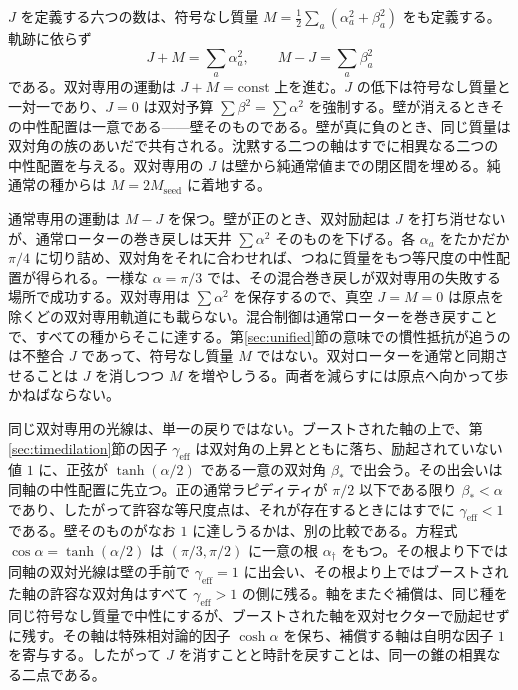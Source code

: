 \documentclass[a4paper]{article}
\begin{document}
$J$ を定義する六つの数は、符号なし質量 $M=\tfrac12\sum_a(\alpha_a^2+\beta_a^2)$ をも定義する。軌跡に依らず
\[
J+M=\sum_a\alpha_a^2,\qquad M-J=\sum_a\beta_a^2
\]
である。双対専用の運動は $J+M=\mathrm{const}$ 上を進む。$J$ の低下は符号なし質量と一対一であり、$J=0$ は双対予算 $\sum\beta^2=\sum\alpha^2$ を強制する。壁が消えるときその中性配置は一意である——壁そのものである。壁が真に負のとき、同じ質量は双対角の族のあいだで共有される。沈黙する二つの軸はすでに相異なる二つの中性配置を与える。双対専用の $J$ は壁から純通常値までの閉区間を埋める。純通常の種からは $M=2M_{\mathrm{seed}}$ に着地する。

通常専用の運動は $M-J$ を保つ。壁が正のとき、双対励起は $J$ を打ち消せないが、通常ローターの巻き戻しは天井 $\sum\alpha^2$ そのものを下げる。各 $\alpha_a$ をたかだか $\pi/4$ に切り詰め、双対角をそれに合わせれば、つねに質量をもつ等尺度の中性配置が得られる。一様な $\alpha=\pi/3$ では、その混合巻き戻しが双対専用の失敗する場所で成功する。双対専用は $\sum\alpha^2$ を保存するので、真空 $J=M=0$ は原点を除くどの双対専用軌道にも載らない。混合制御は通常ローターを巻き戻すことで、すべての種からそこに達する。第\ref{sec:unified}節の意味での慣性抵抗が追うのは不整合 $J$ であって、符号なし質量 $M$ ではない。双対ローターを通常と同期させることは $J$ を消しつつ $M$ を増やしうる。両者を減らすには原点へ向かって歩かねばならない。

同じ双対専用の光線は、単一の戻りではない。ブーストされた軸の上で、第\ref{sec:timedilation}節の因子 $\gamma_{\mathrm{eff}}$ は双対角の上昇とともに落ち、励起されていない値 $1$ に、正弦が $\tanh(\alpha/2)$ である一意の双対角 $\beta_\ast$ で出会う。その出会いは同軸の中性配置に先立つ。正の通常ラピディティが $\pi/2$ 以下である限り $\beta_\ast<\alpha$ であり、したがって許容な等尺度点は、それが存在するときにはすでに $\gamma_{\mathrm{eff}}<1$ である。壁そのものがなお $1$ に達しうるかは、別の比較である。方程式 $\cos\alpha=\tanh(\alpha/2)$ は $(\pi/3,\pi/2)$ に一意の根 $\alpha_\dagger$ をもつ。その根より下では同軸の双対光線は壁の手前で $\gamma_{\mathrm{eff}}=1$ に出会い、その根より上ではブーストされた軸の許容な双対角はすべて $\gamma_{\mathrm{eff}}>1$ の側に残る。軸をまたぐ補償は、同じ種を同じ符号なし質量で中性にするが、ブーストされた軸を双対セクターで励起せずに残す。その軸は特殊相対論的因子 $\cosh\alpha$ を保ち、補償する軸は自明な因子 $1$ を寄与する。したがって $J$ を消すことと時計を戻すことは、同一の錐の相異なる二点である。
\end{document}
